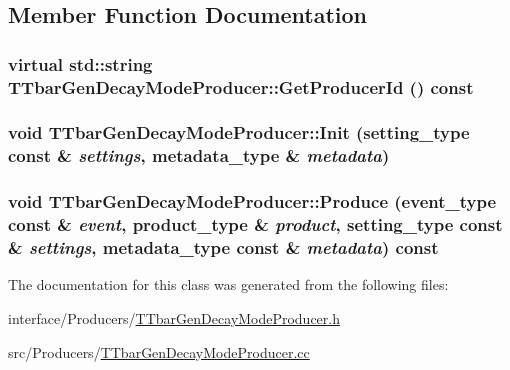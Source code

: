 \subsection{Member Function Documentation}
\hypertarget{classTTbarGenDecayModeProducer_a2298efdb359439c224848aca0cf26a97}{
\subsubsection[{GetProducerId}]{\setlength{\rightskip}{0pt plus 5cm}virtual std::string TTbarGenDecayModeProducer::GetProducerId () const}}
\label{classTTbarGenDecayModeProducer_a2298efdb359439c224848aca0cf26a97}
\hypertarget{classTTbarGenDecayModeProducer_afe7766ec9a39ece78056c90a9aeefeb3}{
\subsubsection[{Init}]{\setlength{\rightskip}{0pt plus 5cm}void TTbarGenDecayModeProducer::Init (setting\_\-type const \& {\em settings}, \/  metadata\_\-type \& {\em metadata})}}
\label{classTTbarGenDecayModeProducer_afe7766ec9a39ece78056c90a9aeefeb3}
\hypertarget{classTTbarGenDecayModeProducer_a1421a1e8afc50c77757d4e4a4a5f1bc8}{
\subsubsection[{Produce}]{\setlength{\rightskip}{0pt plus 5cm}void TTbarGenDecayModeProducer::Produce (event\_\-type const \& {\em event}, \/  product\_\-type \& {\em product}, \/  setting\_\-type const \& {\em settings}, \/  metadata\_\-type const \& {\em metadata}) const}}
\label{classTTbarGenDecayModeProducer_a1421a1e8afc50c77757d4e4a4a5f1bc8}


The documentation for this class was generated from the following files:\begin{DoxyCompactItemize}
\item 
interface/Producers/\hyperlink{TTbarGenDecayModeProducer_8h}{TTbarGenDecayModeProducer.h}\item 
src/Producers/\hyperlink{TTbarGenDecayModeProducer_8cc}{TTbarGenDecayModeProducer.cc}\end{DoxyCompactItemize}
